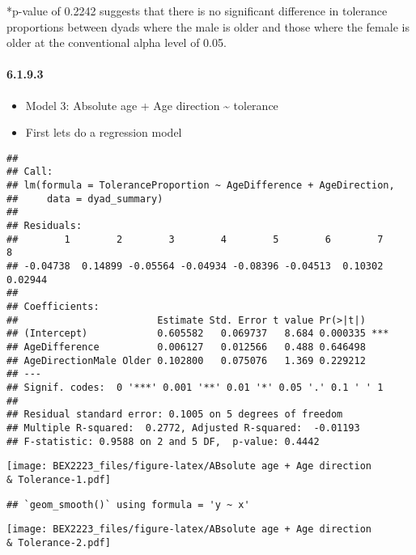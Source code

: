 \documentclass[
]{article}
\begin{document}
*p-value of 0.2242 suggests that there is no significant difference in
tolerance proportions between dyads where the male is older and those
where the female is older at the conventional alpha level of 0.05.

\hypertarget{section-4}{%
\paragraph{6.1.9.3}\label{section-4}}

\begin{itemize}
\item
  Model 3: Absolute age + Age direction \textasciitilde{} tolerance
\item
  First lets do a regression model
\end{itemize}

\begin{verbatim}
## 
## Call:
## lm(formula = ToleranceProportion ~ AgeDifference + AgeDirection, 
##     data = dyad_summary)
## 
## Residuals:
##        1        2        3        4        5        6        7        8 
## -0.04738  0.14899 -0.05564 -0.04934 -0.08396 -0.04513  0.10302  0.02944 
## 
## Coefficients:
##                        Estimate Std. Error t value Pr(>|t|)    
## (Intercept)            0.605582   0.069737   8.684 0.000335 ***
## AgeDifference          0.006127   0.012566   0.488 0.646498    
## AgeDirectionMale Older 0.102800   0.075076   1.369 0.229212    
## ---
## Signif. codes:  0 '***' 0.001 '**' 0.01 '*' 0.05 '.' 0.1 ' ' 1
## 
## Residual standard error: 0.1005 on 5 degrees of freedom
## Multiple R-squared:  0.2772, Adjusted R-squared:  -0.01193 
## F-statistic: 0.9588 on 2 and 5 DF,  p-value: 0.4442
\end{verbatim}

\texttt{[image: BEX2223\_files/figure-latex/ABsolute age + Age direction \\\& Tolerance-1.pdf]}

\begin{verbatim}
## `geom_smooth()` using formula = 'y ~ x'
\end{verbatim}

\texttt{[image: BEX2223\_files/figure-latex/ABsolute age + Age direction \\\& Tolerance-2.pdf]}
\end{document}
